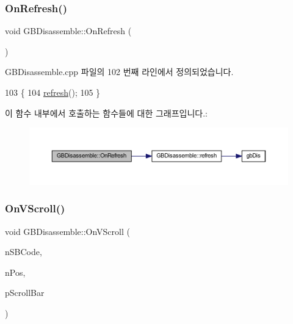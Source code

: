 \mbox{\label{class_g_b_disassemble_a44507cea06041430c59bfe5586f4914a}} 
\subsubsection{\texorpdfstring{On\+Refresh()}{OnRefresh()}}
{\footnotesize\ttfamily void G\+B\+Disassemble\+::\+On\+Refresh (\begin{DoxyParamCaption}{ }\end{DoxyParamCaption})\hspace{0.3cm}{\ttfamily [protected]}}



G\+B\+Disassemble.\+cpp 파일의 102 번째 라인에서 정의되었습니다.


\begin{DoxyCode}
103 \{
104   \mbox{\hyperlink{class_g_b_disassemble_a0ae217c08ead8a3cf62c59dadaa27fde}{refresh}}();
105 \}
\end{DoxyCode}
이 함수 내부에서 호출하는 함수들에 대한 그래프입니다.\+:
\nopagebreak
\begin{figure}[H]
\begin{center}
\leavevmode
\includegraphics[width=350pt]{class_g_b_disassemble_a44507cea06041430c59bfe5586f4914a_cgraph}
\end{center}
\end{figure}
\mbox{\label{class_g_b_disassemble_a80098655a0c93eeecc024a57ac0519ee}} 
\subsubsection{\texorpdfstring{On\+V\+Scroll()}{OnVScroll()}}
{\footnotesize\ttfamily void G\+B\+Disassemble\+::\+On\+V\+Scroll (\begin{DoxyParamCaption}\item[{U\+I\+NT}]{n\+S\+B\+Code,  }\item[{U\+I\+NT}]{n\+Pos,  }\item[{C\+Scroll\+Bar $\ast$}]{p\+Scroll\+Bar }\end{DoxyParamCaption})\hspace{0.3cm}{\ttfamily [protected]}}



